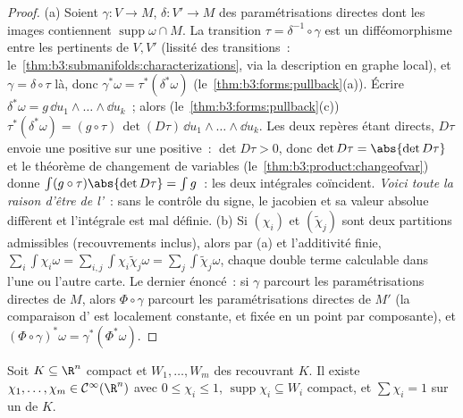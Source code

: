 \begin{proof}
(a) Soient $\gamma\colon V \to M$, $\delta\colon V' \to M$
des paramétrisations directes dont les images contiennent
$\operatorname{supp}\omega\cap M$. La transition $\tau =
\delta^{-1}\circ\gamma$ est un difféomorphisme entre les
 pertinents de $V, V'$ (lissité des transitions~:
le~\cref{thm:b3:submanifolds:characterizations}, via la
description en graphe local), et $\gamma = \delta\circ\tau$
là, donc $\gamma^*\omega = \tau^*(\delta^*\omega)$
(le~\cref{thm:b3:forms:pullback}(a)). Écrire $\delta^*\omega =
g\,\dd u_1\wedge\dots\wedge\dd u_k$~; alors
(le~\cref{thm:b3:forms:pullback}(c)) $\tau^*(\delta^*\omega) =
(g\circ\tau)\,\det(D\tau)\,\dd u_1\wedge\dots\wedge\dd u_k$.
Les deux repères étant directs, $D\tau$ envoie une 
positive sur une  positive~: $\det D\tau > 0$, donc
$\det D\tau = \abs{\det D\tau}$ et le théorème de changement
de variables (le~\cref{thm:b3:product:changeofvar}) donne
$\int(g\circ\tau)\abs{\det D\tau} = \int g$~: les deux
intégrales coïncident. \emph{Voici toute la raison d'être de
l'}~: sans le contrôle du signe, le jacobien et sa
valeur absolue diffèrent et l'intégrale est mal définie.
(b) Si $(\chi_i)$ et $(\tilde\chi_j)$ sont deux partitions
admissibles (recouvrements inclus), alors par (a) et
l'additivité finie, $\sum_i\int\chi_i\omega =
\sum_{i,j}\int\chi_i\tilde\chi_j\omega =
\sum_j\int\tilde\chi_j\omega$, chaque double terme calculable
dans l'une ou l'autre carte. Le dernier énoncé~: si $\gamma$
parcourt les paramétrisations directes de $M$, alors
$\Phi\circ\gamma$ parcourt les paramétrisations directes de
$M'$ (la comparaison d' est localement constante,
et fixée en un point par composante), et $(\Phi\circ\gamma)^*\omega
= \gamma^*(\Phi^*\omega)$.
\end{proof}

\begin{lemma}
\label{lem:b3:forms:partition}
Soit $K \subseteq \R^n$ compact et $W_1, \dots, W_m$ des
 recouvrant $K$. Il existe $\chi_1, \dots, \chi_m \in
\mathcal C^\infty(\R^n)$ avec $0 \leq \chi_i \leq 1$,
$\operatorname{supp}\chi_i \subseteq W_i$ compact, et
$\sum\chi_i = 1$ sur un  de
$K$.
\end{lemma}

